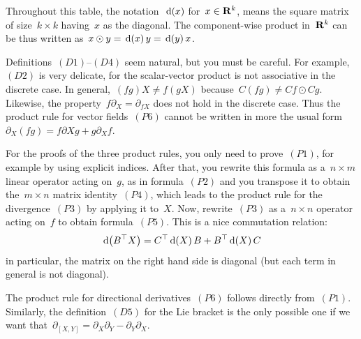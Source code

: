 
Throughout this table, the notation~$$ for~$x\in\R^k$, means the
square matrix of size~$k\times k$ having~$x$ as the diagonal.  The
component-wise product in~$\R^k$ can be thus written as~$x\odot
y=y=x$.

Definitions~$(D1)$--$(D4)$ seem natural, but you must be careful.
For example,~$(D2)$ is very delicate, for the scalar-vector product is not
associative in the discrete case.  In general,~$(fg)X\neq f(gX)$
because~$C(fg)\neq Cf\odot Cg$.
Likewise, the
property~$f\partial_X=\partial_{fX}$ does not hold in
the discrete case.  Thus the product rule for vector fields~$(P6)$ cannot be
written in more the usual form~$\partial_X(fg)=f\partial Xg+g\partial_Xf$.

For the proofs of the three
product rules, you only need to prove~$(P1)$, for
example by using explicit indices.
After that, you rewrite this formula as
a~$n\times m$ linear operator acting on~$g$, as in formula~$(P2)$ and you
transpose it to obtain the~$m\times n$ matrix identity~$(P4)$, which leads to
the product rule for the divergence~$(P3)$ by applying it to~$X$.  Now,
rewrite~$(P3)$ as a~$n\times n$ operator acting on~$f$ to obtain
formula~$(P5)$.   This is a nice commutation relation:
\[
	\,\mathrm{d}\!\left(B^\top X\right)=C^\top\,\mathrm{d}\!\left(X\right)B+B^\top\,\mathrm{d}\!\left(X\right)C
\]
in particular, the matrix on the right hand side is diagonal (but each term
in general is not diagonal).

The product rule for directional derivatives~$(P6)$ follows directly
from~$(P1)$.  Similarly, the definition~$(D5)$ for the Lie bracket is the
only possible one if we want
that~$\partial_{[X,Y]}=\partial_X\partial_Y-\partial_Y\partial_X$.


